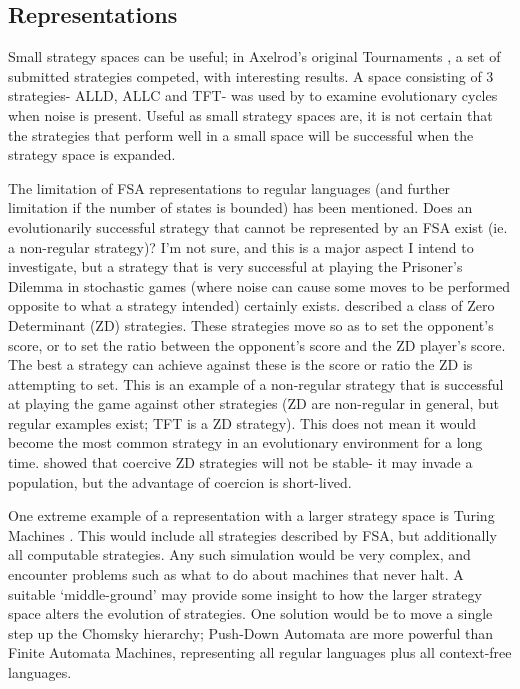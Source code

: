 \documentclass[a4paper,11pt,bcshonoursthesis,singlespace,twoside]{cssethesis}
\renewcommand{\cite}{\citep} %
\begin{document}
\subsection{Representations}
Small strategy spaces can be useful; in Axelrod's original Tournaments \citep{axelrod:Science:1981}, a set of submitted strategies competed, with interesting results. 
A space consisting of 3 strategies- ALLD, ALLC and TFT- was used by \cite{imhof:PNAS:2005} to examine evolutionary cycles when noise is present. 
Useful as small strategy spaces are, it is not certain that the strategies that perform well in a small space will be successful when the strategy space is expanded.

The limitation of FSA representations to regular languages (and further limitation if the number of states is bounded) has been mentioned. 
Does an evolutionarily successful strategy that cannot be represented by an FSA exist (ie. a non-regular strategy)?
I'm not sure, and this is a major aspect I intend to investigate, but a strategy that is very successful at playing the Prisoner's Dilemma in stochastic games (where noise can cause some moves to be performed opposite to what a strategy intended) certainly exists. 
\citet{press2012iterated} described a class of Zero Determinant (ZD) strategies. 
These strategies move so as to set the opponent's score, or to set the ratio between the opponent's score and the ZD player's score. 
The best a strategy can achieve against these is the score or ratio the ZD is attempting to set. 
This is an example of a non-regular strategy that is successful at playing the game against other strategies (ZD are non-regular in general, but regular examples exist; TFT is a ZD strategy). 
This does not mean it would become the most common strategy in an evolutionary environment for a long time. \citet{adami2013evolutionary} showed that coercive ZD strategies will not be stable- it may invade a population, but the advantage of coercion is short-lived. 
 
One extreme example of a representation with a larger strategy space is Turing Machines \citep{Sipser2006}. 
This would include all strategies described by FSA, but additionally all computable strategies. 
Any such simulation would be very complex, and encounter problems such as what to do about machines that never halt.
A suitable `middle-ground' may provide some insight to how the larger strategy space alters the evolution of strategies. One solution would be to move a single step up the Chomsky hierarchy; Push-Down Automata are more powerful than Finite Automata Machines, representing all regular languages plus all context-free languages. 
\end{document}
